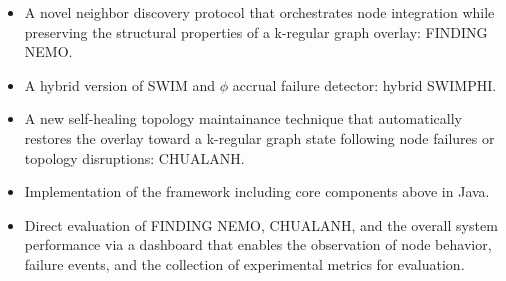 \begin{itemize}

  \item A novel neighbor discovery protocol that orchestrates node integration while preserving the structural properties of a
        k-regular graph overlay: FINDING NEMO.

  \item A hybrid version of SWIM and \texorpdfstring{$\phi$}{phi} accrual failure detector: hybrid SWIMPHI.

  \item A new self-healing topology maintainance technique that automatically restores the overlay toward a k-regular graph
        state following node failures or topology disruptions: CHUALANH.

  \item Implementation of the framework including core components above in Java.

  \item Direct evaluation of FINDING NEMO, CHUALANH, and the overall system performance via a dashboard that enables the
        observation of node behavior, failure events, and the collection of experimental metrics for evaluation.

\end{itemize}
